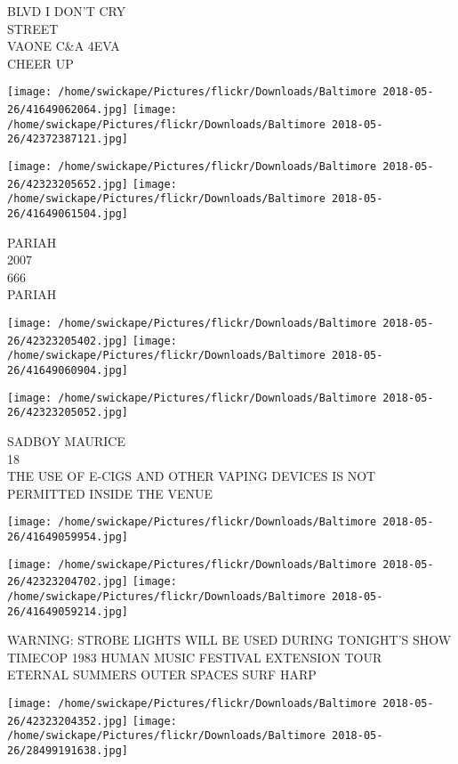 \documentclass[10pt,letterpaper]{article}
\begin{document}
BLVD I DON'T CRY\\
STREET\\
VAONE C\&A 4EVA\\
CHEER UP\\
\pagebreak

\texttt{[image: /home/swickape/Pictures/flickr/Downloads/Baltimore 2018-05-26/41649062064.jpg]}
\texttt{[image: /home/swickape/Pictures/flickr/Downloads/Baltimore 2018-05-26/42372387121.jpg]}

\texttt{[image: /home/swickape/Pictures/flickr/Downloads/Baltimore 2018-05-26/42323205652.jpg]}
\texttt{[image: /home/swickape/Pictures/flickr/Downloads/Baltimore 2018-05-26/41649061504.jpg]}

PARIAH\\
2007\\
666\\
PARIAH\\
\pagebreak

\texttt{[image: /home/swickape/Pictures/flickr/Downloads/Baltimore 2018-05-26/42323205402.jpg]}
\texttt{[image: /home/swickape/Pictures/flickr/Downloads/Baltimore 2018-05-26/41649060904.jpg]}

\texttt{[image: /home/swickape/Pictures/flickr/Downloads/Baltimore 2018-05-26/42323205052.jpg]}

SADBOY MAURICE\\
18\\
THE USE OF E{-}CIGS AND OTHER VAPING DEVICES IS NOT PERMITTED INSIDE THE VENUE\\
\pagebreak

\texttt{[image: /home/swickape/Pictures/flickr/Downloads/Baltimore 2018-05-26/41649059954.jpg]}

\vspace{0.25in}
\texttt{[image: /home/swickape/Pictures/flickr/Downloads/Baltimore 2018-05-26/42323204702.jpg]}
\texttt{[image: /home/swickape/Pictures/flickr/Downloads/Baltimore 2018-05-26/41649059214.jpg]}

WARNING: STROBE LIGHTS WILL BE USED DURING TONIGHT'S SHOW\\
TIMECOP 1983 HUMAN MUSIC FESTIVAL EXTENSION TOUR\\
ETERNAL SUMMERS OUTER SPACES SURF HARP\\
\pagebreak

\texttt{[image: /home/swickape/Pictures/flickr/Downloads/Baltimore 2018-05-26/42323204352.jpg]}
\texttt{[image: /home/swickape/Pictures/flickr/Downloads/Baltimore 2018-05-26/28499191638.jpg]}
\end{document}
